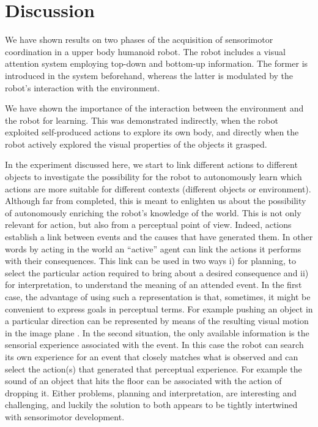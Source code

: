 \section{Discussion}
\label{sect:conclusion}
We have shown results on two phases of the acquisition of sensorimotor coordination in a upper body humanoid robot. The robot includes a visual attention system employing top-down and bottom-up information. The former is introduced in the system beforehand, whereas the latter is modulated by the robot's interaction with the environment. 

We have shown the importance of the interaction between the environment and the robot for learning. This was demonstrated indirectly, when the robot exploited self-produced actions to explore its own body, and directly when the robot actively explored the visual properties of the objects it grasped.

In the experiment discussed here, we start to link different actions to different objects to investigate the possibility for the robot to autonomously learn which actions are more suitable for different contexts (different objects or environment). Although far from completed, this is meant to enlighten us about the possibility of autonomously enriching the robot's knowledge of the world. This is not only relevant for action, but also from a perceptual point of view. Indeed, actions establish a link between events and the causes that have generated them. In other words by acting in the world an ``active'' agent can link the actions it performs with their consequences. This link can be used in two ways i) for planning, to select the particular action required to bring about a desired consequence and ii) for interpretation, to understand the meaning of an attended event. In the first case, the advantage of using such a representation is that, sometimes, it might be convenient to express goals in perceptual terms. For example pushing an object in a particular direction can be represented by means of the resulting visual motion in the image plane \cite{fitzpatrick03learning}.  In the second situation, the only available information is the sensorial experience associated with the event. In this case the robot can search its own experience for an event that closely matches what is observed and can select the action(s) that generated that perceptual experience. For example the sound of an object that hits the floor can be associated with the action of dropping it. Either problems, planning and interpretation, are interesting and challenging, and luckily the solution to both appears to be tightly intertwined with sensorimotor development.

